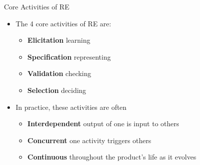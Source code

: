 
\begin{Slide}{Core Activities of RE}


\begin{itemize}
\item The 4 core activities of RE are: 
\begin{itemize}
\item \textbf{Elicitation} \hfill learning
\item \textbf{Specification} \hfill representing
\item \textbf{Validation}  \hfill checking
\item \textbf{Selection}   \hfill deciding
\end{itemize}
\item In practice, these activities are often
\begin{itemize}
\item \textbf{Interdependent} \hfill output of one is input to others
\item \textbf{Concurrent} \hfill one activity triggers others
\item \textbf{Continuous} \hfill throughout the product's life as it evolves

\end{itemize}
\end{itemize}
\end{Slide}